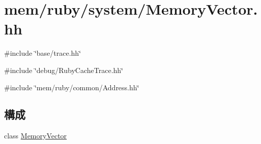 \hypertarget{MemoryVector_8hh}{
\section{mem/ruby/system/MemoryVector.hh}
\label{MemoryVector_8hh}
}
{\ttfamily \#include \char`\"{}base/trace.hh\char`\"{}}\par
{\ttfamily \#include \char`\"{}debug/RubyCacheTrace.hh\char`\"{}}\par
{\ttfamily \#include \char`\"{}mem/ruby/common/Address.hh\char`\"{}}\par
\subsection*{構成}
\begin{DoxyCompactItemize}
\item 
class \hyperlink{classMemoryVector}{MemoryVector}
\end{DoxyCompactItemize}
